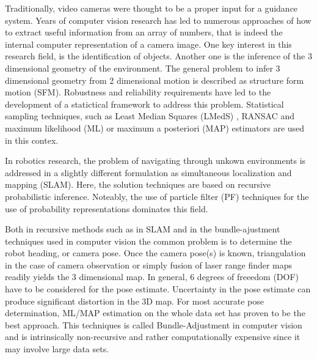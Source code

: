 \documentclass[conference]{IEEEtran}
\begin{document}
Traditionally, video cameras were thought to be a proper input for a guidance system.
Years of computer vision research has led to numerous approaches of how to extract useful
information from an array of numbers, that is indeed the internal computer representation of
a camera image. One key interest in this research field, is the identification of objects.
Another one is the inference of the 3 dimensional geometry of the environment.
The general problem to infer 3 dimensional geometry from 2 dimensional motion is
described as structure form motion (SFM). Robustness and reliability requirements have led
to the development of a statictical framework to address this problem. Statistical sampling
techniques, such as Least Median Squares (LMedS) , RANSAC and maximum likelihood (ML) or
maximum a posteriori (MAP) estimators are used in this contex.

In robotics research, the problem of navigating through unkown environments
is addressed in a slightly different formulation as simultaneous localization and mapping (SLAM).
Here, the solution techniques are based on recursive probabilistic inference. Noteably,
the use of particle filter (PF) techniques for the use of probability representations
dominates this field.

Both in recursive methods such as in SLAM and in the bundle-ajustment techniques used in computer
vision the common problem is to determine the robot heading, or camera pose. Once the camera pose(s) is
known, triangulation in the case of camera observation or simply fusion of laser range finder maps
readily yields the 3 dimensional map. In general, 6 degrees of freeedom (DOF) have to be considered
for the pose estimate. Uncertainty in the pose estimate can produce significant distortion in the
3D map. For most accurate pose determination, ML/MAP estimation on the whole data set has proven to
be the best approach. This techniques is called Bundle-Adjustment in computer vision and is
intrinsically non-recursive and rather computationally expensive since it may involve large data sets.
\end{document}
